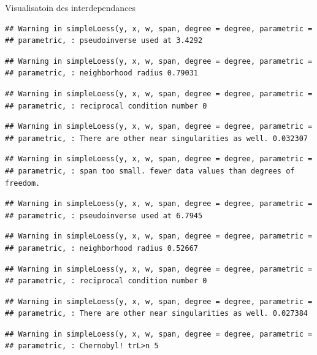 \documentclass[11pt,ignorenonframetext,]{beamer}
\begin{document}
\begin{frame}[fragile]{Visualisatoin des interdependances}
\begin{verbatim}
## Warning in simpleLoess(y, x, w, span, degree = degree, parametric =
## parametric, : pseudoinverse used at 3.4292
\end{verbatim}

\begin{verbatim}
## Warning in simpleLoess(y, x, w, span, degree = degree, parametric =
## parametric, : neighborhood radius 0.79031
\end{verbatim}

\begin{verbatim}
## Warning in simpleLoess(y, x, w, span, degree = degree, parametric =
## parametric, : reciprocal condition number 0
\end{verbatim}

\begin{verbatim}
## Warning in simpleLoess(y, x, w, span, degree = degree, parametric =
## parametric, : There are other near singularities as well. 0.032307
\end{verbatim}

\begin{verbatim}
## Warning in simpleLoess(y, x, w, span, degree = degree, parametric =
## parametric, : span too small. fewer data values than degrees of freedom.
\end{verbatim}

\begin{verbatim}
## Warning in simpleLoess(y, x, w, span, degree = degree, parametric =
## parametric, : pseudoinverse used at 6.7945
\end{verbatim}

\begin{verbatim}
## Warning in simpleLoess(y, x, w, span, degree = degree, parametric =
## parametric, : neighborhood radius 0.52667
\end{verbatim}

\begin{verbatim}
## Warning in simpleLoess(y, x, w, span, degree = degree, parametric =
## parametric, : reciprocal condition number 0
\end{verbatim}

\begin{verbatim}
## Warning in simpleLoess(y, x, w, span, degree = degree, parametric =
## parametric, : There are other near singularities as well. 0.027384
\end{verbatim}

\begin{verbatim}
## Warning in simpleLoess(y, x, w, span, degree = degree, parametric =
## parametric, : Chernobyl! trL>n 5


\end{verbatim}
\end{frame}
\end{document}
